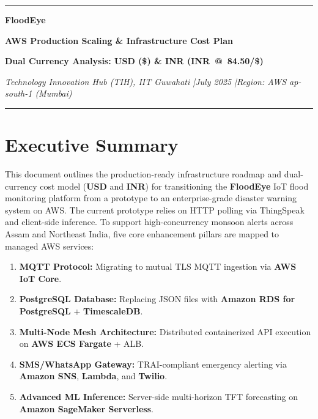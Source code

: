 \documentclass[11pt,a4paper]{article}
\begin{document}

\begin{center}
  {\color{AWSOrg}\rule{\linewidth}{2.5pt}}\par\vspace{4pt}
  {\Huge\bfseries\color{FloodBlue}FloodEye\par}
  \vspace{4pt}
  {\LARGE\bfseries\color{FloodGray}AWS Production Scaling \& Infrastructure Cost Plan\par}
  \vspace{4pt}
  {\large\textbf{Dual Currency Analysis: USD (\$) \& INR (INR~@~84.50/\$)}}\par
  \vspace{6pt}
  {\small\textit{Technology Innovation Hub (TIH), IIT Guwahati \quad|\quad July 2025 \quad|\quad Region: AWS ap-south-1 (Mumbai)}}\par
  \vspace{2pt}
  {\color{FloodBlue}\rule{\linewidth}{1pt}}
\end{center}

\vspace{-4pt}
\section{Executive Summary}

This document outlines the production-ready infrastructure roadmap and dual-currency cost model (\textbf{USD} and \textbf{INR}) for transitioning the \textbf{FloodEye} IoT flood monitoring platform from a prototype to an enterprise-grade disaster warning system on AWS. The current prototype relies on HTTP polling via ThingSpeak and client-side inference. To support high-concurrency monsoon alerts across Assam and Northeast India, five core enhancement pillars are mapped to managed AWS services:

\begin{enumerate}[leftmargin=1.8em,label=\textbf{\arabic*.},itemsep=1pt,topsep=2pt]
  \item \textbf{MQTT Protocol:} Migrating to mutual TLS MQTT ingestion via \textbf{AWS IoT Core}.
  \item \textbf{PostgreSQL Database:} Replacing JSON files with \textbf{Amazon RDS for PostgreSQL} + \textbf{TimescaleDB}.
  \item \textbf{Multi-Node Mesh Architecture:} Distributed containerized API execution on \textbf{AWS ECS Fargate} + ALB.
  \item \textbf{SMS/WhatsApp Gateway:} TRAI-compliant emergency alerting via \textbf{Amazon SNS}, \textbf{Lambda}, and \textbf{Twilio}.
  \item \textbf{Advanced ML Inference:} Server-side multi-horizon TFT forecasting on \textbf{Amazon SageMaker Serverless}.
\end{enumerate}
\end{document}
